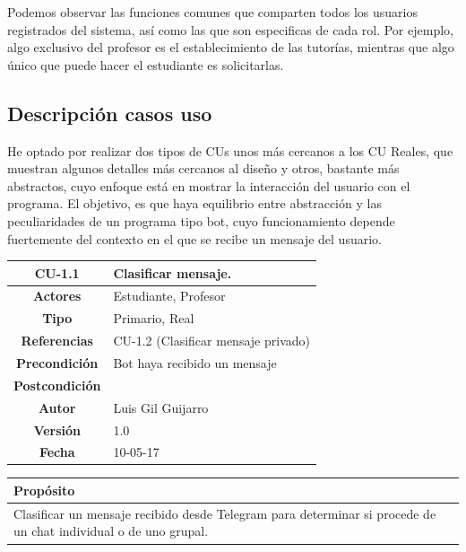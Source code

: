 Podemos observar las funciones comunes que comparten todos los usuarios registrados del sistema, así como las que son especificas de cada rol. Por ejemplo, algo exclusivo del profesor es el establecimiento de las tutorías, mientras que algo único que puede hacer el estudiante es solicitarlas.


\subsection{Descripción casos uso}

He optado por realizar dos tipos de CUs unos más cercanos a los CU Reales, que muestran algunos detalles más cercanos al diseño y otros, bastante más abstractos, cuyo enfoque está en mostrar la interacción del usuario con el programa. El objetivo, es que haya equilibrio entre abstracción y las peculiaridades de un programa tipo bot, cuyo funcionamiento depende fuertemente del contexto en el que se recibe un mensaje del usuario.

\begin{table}[H]

\begin{tabular}{|c|m{10cm}|}
\hline\rowcolor{Gray}
{\bf CU-1.1 } & { Clasificar mensaje.}\\
\hline
{\bf Actores } & { Estudiante, Profesor} \\
\hline\rowcolor{Gray}
{\bf Tipo } & { Primario,  Real} \\
\hline
{\bf Referencias }& {CU-1.2 (Clasificar mensaje privado)} \\
\hline\rowcolor{Gray}
{\bf Precondición }& {Bot haya recibido un mensaje} \\
\hline
{\bf Postcondición }& {}\\
\hline\rowcolor{Gray}
{\bf Autor }& { Luis Gil Guijarro}  \\
\hline
{\bf Versión }& { 1.0} \\
\hline\rowcolor{Gray}
{\bf Fecha }& { 10-05-17} \\
\hline
\end{tabular}

\end{table}

\begin{table}[H]

\begin{tabular}{|m{10cm}|}
\hline\rowcolor{Gray}
{\bf Propósito}\\
\hline
{Clasificar un mensaje recibido desde Telegram para determinar si procede de un chat individual o de uno grupal.} \\
\hline

\end{tabular}


\end{table}

